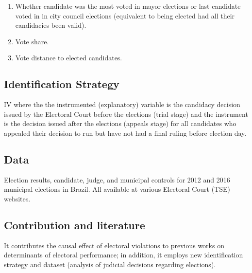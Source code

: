 \documentclass[]{article}
\begin{document}
\begin{enumerate}
\item
  Whether candidate was the most voted in mayor elections or last
  candidate voted in in city council elections (equivalent to being
  elected had all their candidacies been valid).
\item
  Vote share.
\item
  Vote distance to elected candidates.
\end{enumerate}

\hypertarget{identification-strategy}{%
\subsection{Identification Strategy}\label{identification-strategy}}

IV where the the instrumented (explanatory) variable is the candidacy
decision issued by the Electoral Court before the elections (trial
stage) and the instrument is the decision issued after the elections
(appeals stage) for all candidates who appealed their decision to run
but have not had a final ruling before election day.

\hypertarget{data}{%
\subsection{Data}\label{data}}

Election results, candidate, judge, and municipal controls for 2012 and
2016 municipal elections in Brazil. All available at various Electoral
Court (TSE) websites.

\hypertarget{contribution-and-literature}{%
\subsection{Contribution and
literature}\label{contribution-and-literature}}

It contributes the causal effect of electoral violations to previous
works on determinants of electoral performance; in addition, it employs
new identification strategy and dataset (analysis of judicial decisions
regarding elections).
\end{document}
